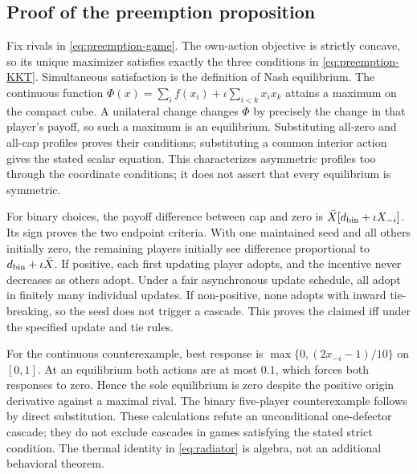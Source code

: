 \subsection{Proof of the preemption proposition}
\label{app:preemption-proof}
Fix rivals in \cref{eq:preemption-game}. The own-action objective is
strictly concave, so its unique maximizer satisfies exactly the three
conditions in \cref{eq:preemption-KKT}. Simultaneous satisfaction is
the definition of Nash equilibrium. The continuous function
$\Phi(x)=\sum_i f(x_i)+\iota\sum_{i<k}x_ix_k$ attains a maximum on
the compact cube. A unilateral change changes $\Phi$ by precisely the
change in that player's payoff, so such a maximum is an equilibrium.
Substituting all-zero and all-cap profiles proves their conditions;
substituting a common interior action gives the stated scalar equation.
This characterizes asymmetric profiles too through the coordinate
conditions; it does not assert that every equilibrium is symmetric.

For binary choices, the payoff difference between cap and zero is
$\bar X[d_{\rm bin}+\iota X_{-i}]$. Its sign proves the two endpoint
criteria. With one maintained seed and all others initially zero, the
remaining players initially see difference proportional to
$d_{\rm bin}+\iota\bar X$. If positive, each first updating player
adopts, and the incentive never decreases as others adopt. Under a fair
asynchronous update schedule, all adopt in finitely many individual
updates. If non-positive, none adopts with inward tie-breaking, so the
seed does not trigger a cascade. This proves the claimed iff under the
specified update and tie rules.

For the continuous counterexample, best response is
$\max\{0,(2x_{-i}-1)/10\}$ on $[0,1]$. At an equilibrium both actions
are at most $0.1$, which forces both responses to zero. Hence the sole
equilibrium is zero despite the positive origin derivative against a
maximal rival. The binary five-player counterexample follows by direct
substitution. These calculations refute an unconditional one-defector
cascade; they do not exclude cascades in games satisfying the stated
strict condition. The thermal identity in \cref{eq:radiator} is algebra,
not an additional behavioral theorem.
